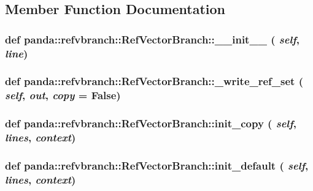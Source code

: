 \subsection{Member Function Documentation}
\hypertarget{classpanda_1_1refvbranch_1_1RefVectorBranch_a31cb3ec50dabb41f9e16d2a4ed97688c}{
\subsubsection[{\_\-\_\-init\_\-\_\-}]{\setlength{\rightskip}{0pt plus 5cm}def panda::refvbranch::RefVectorBranch::\_\-\_\-init\_\-\_\- ( {\em self}, \/   {\em line})}}
\label{classpanda_1_1refvbranch_1_1RefVectorBranch_a31cb3ec50dabb41f9e16d2a4ed97688c}
\hypertarget{classpanda_1_1refvbranch_1_1RefVectorBranch_ac67489054a7af1123de1f57498d6f470}{
\subsubsection[{\_\-write\_\-ref\_\-set}]{\setlength{\rightskip}{0pt plus 5cm}def panda::refvbranch::RefVectorBranch::\_\-write\_\-ref\_\-set ( {\em self}, \/   {\em out}, \/   {\em copy} = {\ttfamily False})}}
\label{classpanda_1_1refvbranch_1_1RefVectorBranch_ac67489054a7af1123de1f57498d6f470}
\hypertarget{classpanda_1_1refvbranch_1_1RefVectorBranch_a68089f2e817a0029f199ace3a39efe25}{
\subsubsection[{init\_\-copy}]{\setlength{\rightskip}{0pt plus 5cm}def panda::refvbranch::RefVectorBranch::init\_\-copy ( {\em self}, \/   {\em lines}, \/   {\em context})}}
\label{classpanda_1_1refvbranch_1_1RefVectorBranch_a68089f2e817a0029f199ace3a39efe25}
\hypertarget{classpanda_1_1refvbranch_1_1RefVectorBranch_a0552ee354e3a369c54081332ec0d82c2}{
\subsubsection[{init\_\-default}]{\setlength{\rightskip}{0pt plus 5cm}def panda::refvbranch::RefVectorBranch::init\_\-default ( {\em self}, \/   {\em lines}, \/   {\em context})}}
